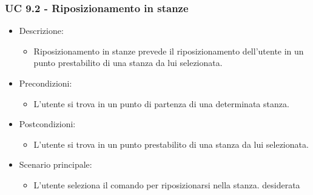 \subsubsection{UC 9.2 - Riposizionamento in stanze}
\begin{itemize}

	\item Descrizione:
	\begin{itemize}
		\item Riposizionamento in stanze prevede il riposizionamento dell'utente in un punto prestabilito di una stanza da lui selezionata.
	\end{itemize}
	
	\item Precondizioni:
	\begin{itemize}
		\item L'utente si trova in un punto di partenza di una determinata stanza.
	\end{itemize}
	
	\item Postcondizioni:
	\begin{itemize}
		\item L'utente si trova in un punto prestabilito di una stanza da lui selezionata.
	\end{itemize}
	
	\item Scenario principale:
	\begin{itemize}
		\item L'utente seleziona il comando per riposizionarsi nella stanza. desiderata
	\end{itemize}
	
\end{itemize}

